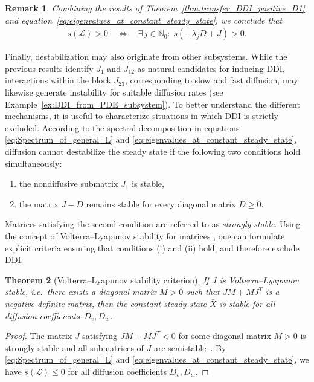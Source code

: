 \documentclass[12pt, a4paper]{amsart}
\numberwithin{equation}{section}
\newcommand{\CSS}{\bar{X}}
\newcommand{\Ds}{D_v}
\newcommand{\Df}{D_w}
\renewcommand{\L}{{\mathcal{L}}}
\newtheorem{theorem}{\bf Theorem}[section]
\newtheorem{remark}[theorem]{\bf Remark}
\begin{document}
\begin{remark}\label{rem:s(L)>0}
    Combining the results of Theorem~\ref{thm:transfer_DDI_positive_D1} and equation~\eqref{eq:eigenvalues_at_constant_steady_state}, we conclude that
    \begin{align}
        s(\L) > 0 \quad \Longleftrightarrow \quad \exists\, j \in \mathbb{N}_0 : \; s(-\lambda_j D + J) > 0.
    \end{align}
\end{remark}

Finally, destabilization may also originate from other subsystems. While the previous results identify $J_1$ and $J_{12}$ as natural candidates for
inducing DDI, interactions within the block
$J_{23}$, corresponding to slow and fast diffusion, may likewise generate
instability for suitable diffusion rates (see
Example~\ref{ex:DDI_from_PDE_subsystem}). To better understand the different mechanisms, it is useful
to characterize situations in which DDI is
strictly excluded. According to the spectral decomposition in
equations \eqref{eq:Spectrum_of_general_L} and
\eqref{eq:eigenvalues_at_constant_steady_state}, diffusion cannot
destabilize the steady state if the following two conditions hold
simultaneously:
\begin{enumerate}[label=(\roman*),noitemsep,topsep=0pt]
    \item the nondiffusive submatrix $J_1$ is stable,
    \item the matrix $J-D$ remains stable for every diagonal matrix $D \geqslant 0$.
\end{enumerate}
Matrices satisfying the second condition are referred to as
\emph{strongly stable}. Using the concept of Volterra--Lyapunov
stability for matrices \cite{Cross}, one can formulate explicit criteria ensuring that
conditions (i) and (ii) hold, and therefore exclude DDI.

\begin{theorem}[Volterra--Lyapunov stability criterion]\label{thm:NoDDI}
    If $J$ is Volterra--Lyapunov stable, i.e.\ there exists a diagonal matrix $M>0$ such that $JM+MJ^T$ is a negative definite matrix, then the constant steady state $\CSS$ is stable for all diffusion coefficients~$\Ds, \Df$.
\end{theorem}

\begin{proof}
    The matrix $J$ satisfying $JM + MJ^T<0$ for some diagonal matrix $M>0$ is strongly stable and all submatrices of $J$ are semistable~\cite[Proposition~1, Theorem~1]{Cross}. By \eqref{eq:Spectrum_of_general_L} and \eqref{eq:eigenvalues_at_constant_steady_state}, we have $s(\L)\leqslant 0$ for all diffusion coefficients $\Ds, \Df$.
\end{proof}
\end{document}
